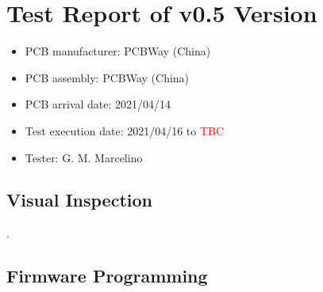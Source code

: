 %
%
%
%
%

%
%
%
%
%
%

\chapter{Test Report of v0.5 Version} \label{anx:test-report-v05}

\begin{itemize}
    \item PCB manufacturer: PCBWay (China)
    \item PCB assembly: PCBWay (China)
    \item PCB arrival date: 2021/04/14
    \item Test execution date: 2021/04/16 to \textcolor{red}{TBC}
    \item Tester: G. M. Marcelino
\end{itemize}

\section{Visual Inspection}

.

\section{Firmware Programming}

